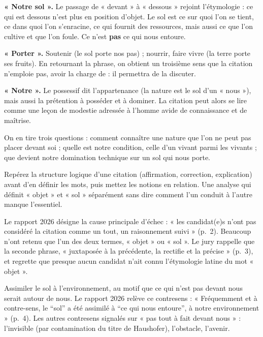 \documentclass[11pt,a4paper]{article}
\begin{document}
\textbf{« Notre sol ».} Le passage de « devant » à « dessous » rejoint l'étymologie : ce qui est dessous n'est plus en position d'objet. Le sol est ce sur quoi l'on se tient, ce dans quoi l'on s'enracine, ce qui fournit des ressources, mais aussi ce que l'on cultive et que l'on foule. Ce n'est \textbf{pas} ce qui nous entoure.

\textbf{« Porter ».} Soutenir (le sol porte nos pas) ; nourrir, faire vivre (la terre porte ses fruits). En retournant la phrase, on obtient un troisième sens que la citation n'emploie pas, avoir la charge de : il permettra de la discuter.

\textbf{« Notre ».} Le possessif dit l'appartenance (la nature est le sol d'un « nous »), mais aussi la prétention à posséder et à dominer. La citation peut alors se lire comme une leçon de modestie adressée à l'homme avide de connaissance et de maîtrise.

On en tire trois questions : comment connaître une nature que l'on ne peut pas placer devant soi ; quelle est notre condition, celle d'un vivant parmi les vivants ; que devient notre domination technique sur un sol qui nous porte.

\begin{methode}

Repérez la structure logique d'une citation (affirmation, correction, explication) avant d'en définir les mots, puis mettez les notions en relation. Une analyse qui définit « objet » et « sol » séparément sans dire comment l'un conduit à l'autre manque l'essentiel.

\end{methode}

\begin{jury}

Le rapport 2026 désigne la cause principale d'échec : « les candidat(e)s n'ont pas considéré la citation comme un tout, un raisonnement suivi » (p.~2). Beaucoup n'ont retenu que l'un des deux termes, « objet » ou « sol ». Le jury rappelle que la seconde phrase, « juxtaposée à la précédente, la rectifie et la précise » (p.~3), et regrette que presque aucun candidat n'ait connu l'étymologie latine du mot « objet ».

\end{jury}

\begin{piege}

Assimiler le sol à l'environnement, au motif que ce qui n'est pas devant nous serait autour de nous. Le rapport 2026 relève ce contresens : « Fréquemment et à contre-sens, le ``sol'' a été assimilé à ``ce qui nous entoure'', à notre environnement » (p.~4). Les autres contresens signalés sur « pas tout à fait devant nous » : l'invisible (par contamination du titre de Haushofer), l'obstacle, l'avenir.

\end{piege}
\end{document}
